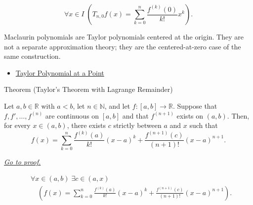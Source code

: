 \begin{remark*}
\[
\forall x\in I\;
\left(
  T_{n,0}f(x)=\sum_{k=0}^{n}\frac{f^{(k)}(0)}{k!}x^k
\right).
\]
\end{remark*}

\begin{remark*}[Interpretation]
Maclaurin polynomials are Taylor polynomials centered at the origin. They are
not a separate approximation theory; they are the centered-at-zero case of
the same construction.
\end{remark*}

\begin{dependencies}
\begin{itemize}
  \item \hyperref[def:taylor-polynomial-at-a-point]{Taylor Polynomial at a Point}
\end{itemize}
\end{dependencies}


\begin{theorembox}{Theorem (Taylor's Theorem with Lagrange Remainder)}
\begin{theorem}
\label{thm:taylor-theorem-lagrange-remainder}
Let $a,b\in\mathbb{R}$ with $a<b$, let $n\in\mathbb{N}$, and let
$f:[a,b]\to\mathbb{R}$. Suppose that $f,f',\ldots,f^{(n)}$ are continuous
on $[a,b]$ and that $f^{(n+1)}$ exists on $(a,b)$. Then, for every
$x\in(a,b)$, there exists $c$ strictly between $a$ and $x$ such that
\[
  f(x)
  =
  \sum_{k=0}^{n}\frac{f^{(k)}(a)}{k!}(x-a)^k
  +
  \frac{f^{(n+1)}(c)}{(n+1)!}(x-a)^{n+1}.
\]

\smallskip
\noindent
\hyperref[prf:taylor-theorem-lagrange-remainder]{\textit{Go to proof.}}
\end{theorem}
\end{theorembox}

\begin{remark*}
\[
\begin{aligned}
&\forall x\in(a,b)\;\exists c\in(a,x)\\
&\quad
\left(
  f(x)
  =
  \sum_{k=0}^{n}\frac{f^{(k)}(a)}{k!}(x-a)^k
  +
  \frac{f^{(n+1)}(c)}{(n+1)!}(x-a)^{n+1}
\right).
\end{aligned}
\]
\end{remark*}

